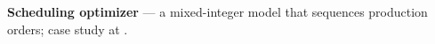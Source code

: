 \item \textbf{Scheduling optimizer} — a mixed-integer model that sequences production orders; case study at \cvweb.
